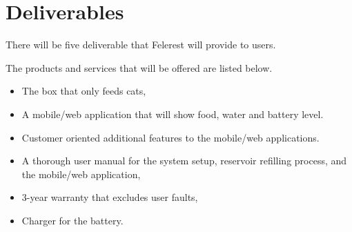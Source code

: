 \section{Deliverables} \label{sec:deliverables}
There will be five deliverable that Felerest will provide to users.

The products and services that will be offered are listed below.
\begin{itemize}
\item The box that only feeds cats,
\item A mobile/web application that will show food, water and battery level.
\item Customer oriented additional features to the mobile/web applications.
\item A thorough user manual for the system setup, reservoir refilling process, and the mobile/web application,
\item 3-year warranty that excludes user faults,
\item Charger for the battery.
\end{itemize}